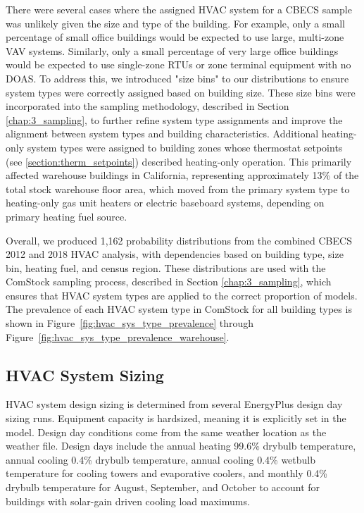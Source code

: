 There were several cases where the assigned HVAC system for a CBECS sample was unlikely given the size and type of the building. For example, only a small percentage of small office buildings would be expected to use large, multi-zone VAV systems. Similarly, only a small percentage of very large office buildings would be expected to use single-zone RTUs or zone terminal equipment with no DOAS. To address this, we introduced "size bins" to our distributions to ensure system types were correctly assigned based on building size. These size bins were incorporated into the sampling methodology, described in Section \ref{chap:3_sampling}, to further refine system type assignments and improve the alignment between system types and building characteristics. Additional heating-only system types were assigned to building zones whose thermostat setpoints (see \ref{section:therm_setpoints}) described heating-only operation. This primarily affected warehouse buildings in California, representing approximately 13\% of the total stock warehouse floor area, which moved from the primary system type to heating-only gas unit heaters or electric baseboard systems, depending on primary heating fuel source.

Overall, we produced 1,162 probability distributions from the combined CBECS 2012 and 2018 HVAC analysis, with dependencies based on building type, size bin, heating fuel, and census region. These distributions are used with the ComStock sampling process, described in Section \ref{chap:3_sampling}, which ensures that HVAC system types are applied to the correct proportion of models. The prevalence of each HVAC system type in ComStock for all building types is shown in Figure~\ref{fig:hvac_sys_type_prevalence} through Figure~\ref{fig:hvac_sys_type_prevalence_warehouse}.


\subsection{HVAC System Sizing}

HVAC system design sizing is determined from several EnergyPlus design day sizing runs. Equipment capacity is hardsized, meaning it is explicitly set in the model. Design day conditions come from the same weather location as the weather file. Design days include the annual heating 99.6\% drybulb temperature, annual cooling 0.4\% drybulb temperature, annual cooling 0.4\% wetbulb temperature for cooling towers and evaporative coolers, and monthly 0.4\% drybulb temperature for August, September, and October to account for buildings with solar-gain driven cooling load maximums.

